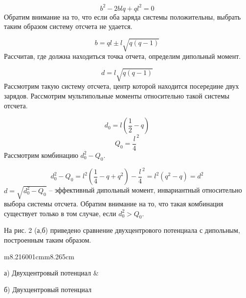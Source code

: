 \documentclass[a4paper]{article}
\makeatletter
\newcommand\arraybslash{\let\\\@arraycr}
\makeatother
\begin{document}
\begin{equation*}
b^2-2\mathit{blq}+ql^2=0
\end{equation*}
Обратим внимание на то, что если оба заряда системы положительны, выбрать таким образом систему отсчета не удается.

\begin{equation*}
b=\mathit{ql}\pm l\sqrt{q\left(q-1\right)}
\end{equation*}
Рассчитав, где должна находиться точка отчета, определим дипольный момент.

\begin{equation*}
d=l\sqrt{q\left(q-1\right)}
\end{equation*}
Рассмотрим такую систему отсчета, центр которой находится посередине двух зарядов. Рассмотрим мультипольные моменты относительно такой системы отсчета.

\begin{equation*}
d_0=l\left(\frac 1 2-q\right)
\end{equation*}
\begin{equation*}
Q_0=\frac l 4^2
\end{equation*}
Рассмотрим комбинацию  $d_0^2-Q_0$.

\begin{equation*}
d_0^2-Q_0=l^2\left(\frac 1 4-q+q^2\right)-\frac l 4^2=l^2\left(q^2-q\right)=d^2
\end{equation*}
 $d=\sqrt{d_0^2-Q_0}$ -- эффективный дипольный момент, инвариантный относительно выбора системы отсчета. Обратим внимание на то, что такая комбинация существует только в том
случае, если  $d_0^2>Q_0$.

На рис. 2 (а,б) приведено сравнение двухцентрового потенциала с дипольным, построенным таким образом.

\begin{flushleft}
\tablefirsthead{}
\tablehead{}
\tabletail{}
\tablelasttail{}
\begin{supertabular}{m{8.216001cm}m{8.265cm}}
{%
 \par}
\centering а) Двухцентровый
потенциал &
{%
 \par}
\centering\arraybslash б)
Двухцентровый
потенциал\\
\\
\end{supertabular}
\end{flushleft}
\end{document}
